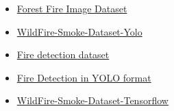 \begin{itemize}
	\item \href{https://www.kaggle.com/datasets/cristiancristancho/forest-fire-image-dataset}{Forest Fire Image Dataset}
	\item \href{https://www.kaggle.com/datasets/ahemateja19bec1025/wildfiresmokedatasetyolo}{WildFire-Smoke-Dataset-Yolo}
	\item \href{https://www.kaggle.com/datasets/kabilan03/fire-detection-dataset}{Fire detection dataset}
	\item \href{https://www.kaggle.com/datasets/ankan1998/fire-detection-in-yolo-format}{Fire Detection in YOLO format}
	\item \href{https://www.kaggle.com/datasets/ahemateja19bec1025/wildfiresmokedataset}{WildFire-Smoke-Dataset-Tensorflow}
\end{itemize}
